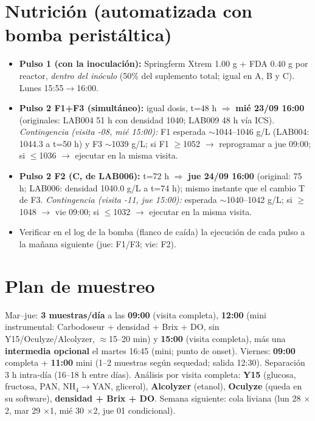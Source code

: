 \documentclass[10pt,landscape]{article}
\begin{document}
\section{Nutrición (automatizada con bomba peristáltica)}
\begin{itemize}\setlength{\itemsep}{1pt}
\item \textbf{Pulso 1 (con la inoculación):} Springferm Xtrem 1.00 g + FDA 0.40 g por reactor, \emph{dentro del inóculo} (50\% del suplemento total; igual en A, B y C). Lunes 15:55$\rightarrow$16:00.
\item \textbf{Pulso 2 F1+F3 (simultáneo):} igual dosis, t=48 h $\Rightarrow$ \textbf{mié 23/09 16:00} (originales: LAB004 51 h con densidad 1040; LAB009 48 h vía ICS). \emph{Contingencia (visita -08, mié 15:00):} F1 esperada $\sim$1044--1046 g/L (LAB004: 1044.3 a t=50 h) y F3 $\sim$1039 g/L; si F1 $\geq$1052 $\rightarrow$ reprogramar a jue 09:00; si $\leq$1036 $\rightarrow$ ejecutar en la misma visita.
\item \textbf{Pulso 2 F2 (C, de LAB006):} t=72 h $\Rightarrow$ \textbf{jue 24/09 16:00} (original: 75 h; LAB006: densidad 1040.0 g/L a t=74 h); mismo instante que el cambio T de F3. \emph{Contingencia (visita -11, jue 15:00):} esperada $\sim$1040--1042 g/L; si $\geq$1048 $\rightarrow$ vie 09:00; si $\leq$1032 $\rightarrow$ ejecutar en la misma visita.
\item Verificar en el log de la bomba (flanco de caída) la ejecución de cada pulso a la mañana siguiente (jue: F1/F3; vie: F2).
\end{itemize}

\section{Plan de muestreo}
Mar--jue: \textbf{3 muestras/día} a las \textbf{09:00} (visita completa), \textbf{12:00} (mini instrumental: Carbodoseur + densidad + Brix + DO, sin Y15/Oculyze/Alcolyzer, $\approx$15--20 min) y \textbf{15:00} (visita completa), más una \textbf{intermedia opcional} el martes 16:45 (mini; punto de onset). Viernes: \textbf{09:00} completa + \textbf{11:00} mini (1--2 muestras según sequedad; salida 12:30). Separación 3 h intra-día (16--18 h entre días). Análisis por visita completa: \textbf{Y15} (glucosa, fructosa, PAN, NH$_4\rightarrow$YAN, glicerol), \textbf{Alcolyzer} (etanol), \textbf{Oculyze} (queda en su software), \textbf{densidad + Brix + DO}. Semana siguiente: cola liviana (lun 28 $\times$2, mar 29 $\times$1, mié 30 $\times$2, jue 01 condicional).
\end{document}
